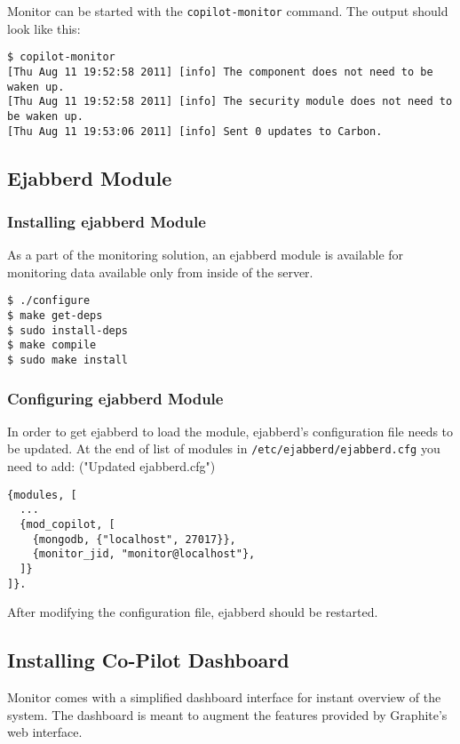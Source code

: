 Monitor can be started with the \texttt{copilot-monitor} command. The output should look like this:
\lstset{caption=Starting \copilot Monitor}
\begin{lstlisting}
$ copilot-monitor
[Thu Aug 11 19:52:58 2011] [info] The component does not need to be waken up.
[Thu Aug 11 19:52:58 2011] [info] The security module does not need to be waken up.
[Thu Aug 11 19:53:06 2011] [info] Sent 0 updates to Carbon.
\end{lstlisting}

\subsection{Ejabberd Module}

\subsubsection{Installing ejabberd Module}

As a part of the monitoring solution, an ejabberd module is available for monitoring data available only from inside of the server.
\lstset{caption=Installing ejabberd module}
\begin{lstlisting}
$ ./configure
$ make get-deps
$ sudo install-deps
$ make compile
$ sudo make install
\end{lstlisting}

\subsubsection{Configuring ejabberd Module}

In order to get ejabberd to load the module, ejabberd's configuration file needs to be updated. At the end of list of modules in \texttt{/etc/ejabberd/ejabberd.cfg} you need to add:
\lstset("Updated ejabberd.cfg")
\begin{lstlisting}
{modules, [
  ...
  {mod_copilot, [
    {mongodb, {"localhost", 27017}},
    {monitor_jid, "monitor@localhost"},
  ]}
]}.
\end{lstlisting}

After modifying the configuration file, ejabberd should be restarted.

\subsection{Installing Co-Pilot Dashboard}

Monitor comes with a simplified dashboard interface for instant overview of the system. The dashboard is meant to augment the features provided by Graphite's web interface.

